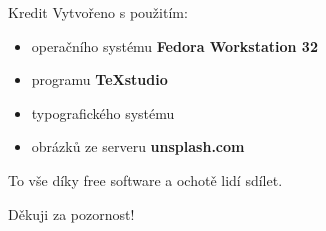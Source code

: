 \documentclass[11pt]{beamer}
\begin{document}
\begin{frame}{Kredit}
	Vytvořeno s použitím:
	\begin{itemize}
		\item operačního systému \textbf{Fedora Workstation 32}
		\item programu \textbf{\TeX{studio}}
		\item typografického systému \textbf{\LaTeXe}
		\item obrázků ze serveru \textbf{unsplash.com}
	\end{itemize}
	To vše díky free software a ochotě lidí sdílet.
\end{frame}

\begin{frame}
	\begin{center}
		{\Huge Děkuji za pozornost!}
	\end{center}
\end{frame}
\end{document}
